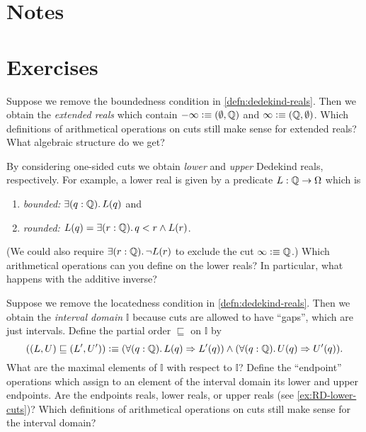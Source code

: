 \section*{Notes}
\label{sec:reals-notes}

\section*{Exercises}
\label{sec:reals-exercises}

\begin{ex} \label{ex:RD-extended-reals}
  Suppose we remove the boundedness condition in \autoref{defn:dedekind-reals}.
  Then we obtain the \emph{extended reals} which contain $-\infty \vcentcolon\equiv
  (\emptyset, \mathbb{Q})$ and $\infty \vcentcolon\equiv (\mathbb{Q}, \emptyset)$. Which definitions of arithmetical
  operations on cuts still make sense for extended reals? What algebraic structure do we
  get?
\end{ex}

\begin{ex} \label{ex:RD-lower-cuts}
  By considering one-sided cuts we obtain \emph{lower} and \emph{upper} Dedekind reals,
  respectively. For example, a lower real is given by a predicate $L : \mathbb{Q} \to \Omega$
  which is
  \begin{enumerate}
  \item \emph{bounded:} $\exis{q : \Q} L(q)$ and
  \item \emph{rounded:} $L(q) = \exis{r : \Q} q < r \land L(r)$.
  \end{enumerate}
  (We could also require $\exis{r : \Q} \lnot L(r)$ to exclude the cut $\infty \vcentcolon\equiv
  \mathbb{Q}$.) Which arithmetical operations can you define on the lower reals? In particular,
  what happens with the additive inverse?
\end{ex}

\begin{ex} \label{ex:RD-interval-arithmetic}
  Suppose we remove the locatedness condition in \autoref{defn:dedekind-reals}.
  Then we obtain the \emph{interval domain} $\mathbb{I}$ because cuts are allowed
  to have ``gaps'', which are just intervals. Define the partial order $\sqsubseteq$ on
  $\mathbb{I}$ by
  \begin{equation*}
    ((L, U) \sqsubseteq (L', U'))
    \defeq
    (\fall{q : \Q} L(q) \Rightarrow L'(q)) \land
    (\fall{q : \Q} U(q) \Rightarrow U'(q)).
  \end{equation*}
  What are the maximal elements of $\mathbb{I}$ with respect to $\mathbb{I}$? Define the
  ``endpoint'' operations which assign to an element of the interval domain its lower and
  upper endpoints. Are the endpoints reals, lower reals, or upper reals (see
  \autoref{ex:RD-lower-cuts})? Which definitions of arithmetical operations on cuts still
  make sense for the interval domain?
\end{ex}

